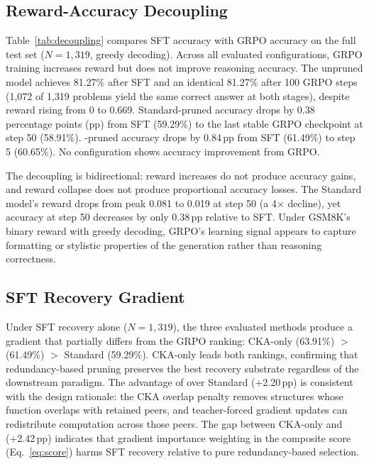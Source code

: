 \subsection{Reward-Accuracy Decoupling}
\label{sec:decoupling}



Table~\ref{tab:decoupling} compares SFT accuracy with GRPO accuracy on the full test set ($N{=}1{,}319$, greedy decoding).
Across all evaluated configurations, GRPO training increases reward but does not improve reasoning accuracy.
The unpruned model achieves 81.27\% after SFT and an identical 81.27\% after 100 GRPO steps (1{,}072 of 1{,}319 problems yield the same correct answer at both stages), despite reward rising from 0 to 0.669.
Standard-pruned accuracy drops by 0.38 percentage points (pp) from SFT (59.29\%) to the last stable GRPO checkpoint at step 50 (58.91\%).
\rasp{}-pruned accuracy drops by 0.84\,pp from SFT (61.49\%) to step 5 (60.65\%).
No configuration shows accuracy improvement from GRPO.

The decoupling is bidirectional: reward increases do not produce accuracy gains, and reward collapse does not produce proportional accuracy losses.
The Standard model's reward drops from peak 0.081 to 0.019 at step 50 (a 4$\times$ decline), yet accuracy at step 50 decreases by only 0.38\,pp relative to SFT.
Under GSM8K's binary reward with greedy decoding, GRPO's learning signal appears to capture formatting or stylistic properties of the generation rather than reasoning correctness.


\subsection{SFT Recovery Gradient}
\label{sec:sft_gradient}

Under SFT recovery alone ($N{=}1{,}319$), the three evaluated methods produce a gradient that partially differs from the GRPO ranking: CKA-only (63.91\%) $>$ \rasp{} (61.49\%) $>$ Standard (59.29\%).
CKA-only leads both rankings, confirming that redundancy-based pruning preserves the best recovery substrate regardless of the downstream paradigm.
The advantage of \rasp{} over Standard (+2.20\,pp) is consistent with the design rationale: the CKA overlap penalty removes structures whose function overlaps with retained peers, and teacher-forced gradient updates can redistribute computation across those peers.
The gap between CKA-only and \rasp{} (+2.42\,pp) indicates that gradient importance weighting in the composite score (Eq.~\ref{eq:score}) harms SFT recovery relative to pure redundancy-based selection.

